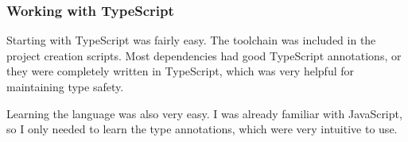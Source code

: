 \subsubsection{Working with TypeScript}\label{sec:working-with-typescript}

Starting with TypeScript was fairly easy.
The toolchain was included in the project creation scripts.
Most dependencies had good TypeScript annotations,
or they were completely written in TypeScript,
which was very helpful for maintaining type safety.

Learning the language was also very easy.
I was already familiar with JavaScript,
so I only needed to learn the type annotations,
which were very intuitive to use.
